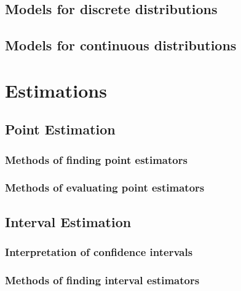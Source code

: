 \documentclass[]{book}
\begin{document}
\hypertarget{models-for-discrete-distributions}{%
\section{Models for discrete distributions}\label{models-for-discrete-distributions}}

\hypertarget{models-for-continuous-distributions}{%
\section{Models for continuous distributions}\label{models-for-continuous-distributions}}

\hypertarget{estimations}{%
\chapter{Estimations}\label{estimations}}

\hypertarget{point-estimation}{%
\section{Point Estimation}\label{point-estimation}}

\hypertarget{methods-of-finding-point-estimators}{%
\subsection{Methods of finding point estimators}\label{methods-of-finding-point-estimators}}

\hypertarget{methods-of-evaluating-point-estimators}{%
\subsection{Methods of evaluating point estimators}\label{methods-of-evaluating-point-estimators}}

\hypertarget{interval-estimation}{%
\section{Interval Estimation}\label{interval-estimation}}

\hypertarget{interpretation-of-confidence-intervals}{%
\subsection{Interpretation of confidence intervals}\label{interpretation-of-confidence-intervals}}

\hypertarget{methods-of-finding-interval-estimators}{%
\subsection{Methods of finding interval estimators}\label{methods-of-finding-interval-estimators}}
\end{document}
